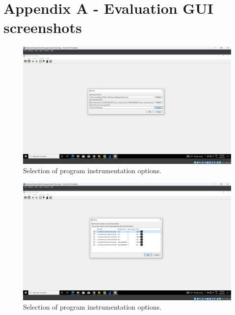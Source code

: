 \documentclass[conference]{IEEEtran}
\begin{document}
\newpage
\section*{Appendix A - Evaluation GUI screenshots}\label{appendix_eval_screenshots}

\begin{figure}[htbp]
    \centerline{\includegraphics[width=1.0\columnwidth]{images/sch_s1.png}}
    \caption{Selection of program instrumentation options.}
    \label{figure:ap_sch_s1}
\end{figure}

\begin{figure}[htbp]
    \centerline{\includegraphics[width=1.0\columnwidth]{images/sch_s2.png}}
    \caption{Selection of program instrumentation options.}
    \label{figure:ap_sch_s2}
\end{figure}
\end{document}
